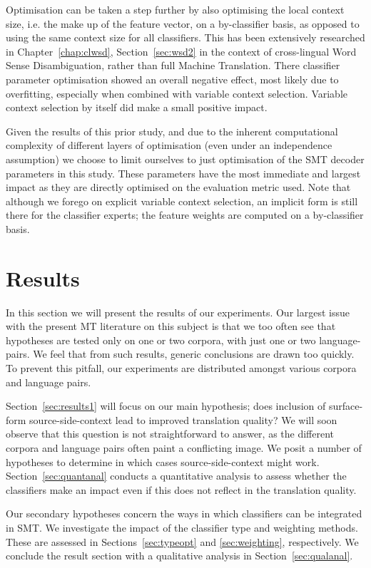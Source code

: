 Optimisation can be taken a step further by also optimising the local context
size, i.e. the make up of the feature vector, on a by-classifier basis, as
opposed to using the same context size for all classifiers. This has been
extensively researched in Chapter~\ref{chap:clwsd}, Section~\ref{sec:wsd2} in
the context of cross-lingual Word Sense Disambiguation, rather than full
Machine Translation. There classifier parameter optimisation showed an
overall negative effect, most likely due to overfitting, especially when
combined with variable context selection. Variable context selection by itself
did make a small positive impact.

Given the results of this prior study, and due to the inherent computational
complexity of different layers of optimisation (even under an independence
assumption) we choose to limit ourselves to just optimisation of the SMT
decoder parameters in this study. These parameters have the most immediate and
largest impact as they are directly optimised on the evaluation metric used.
Note that although we forego on explicit variable context selection, an
implicit form is still there for the classifier experts; the feature weights
are computed on a by-classifier basis.

\section{Results}
\label{sec:results}

In this section we will present the results of our experiments.  Our largest
issue with the present MT literature on this subject is that we too often see
that hypotheses are tested only on one or two corpora, with just one or two
language-pairs. We feel that from such results, generic conclusions are drawn
too quickly. To prevent this pitfall, our experiments are distributed amongst
various corpora and language pairs.

Section~\ref{sec:results1} will focus on our main hypothesis; does inclusion of
surface-form source-side-context lead to improved translation quality? We will
soon observe that this question is not straightforward to answer, as the
different corpora and language pairs often paint a conflicting image. We posit
a number of hypotheses to determine in which cases source-side-context might
work. Section~\ref{sec:quantanal} conducts a quantitative analysis to assess
whether the classifiers make an impact even if this does not reflect in the
translation quality.

Our secondary hypotheses concern the ways in which classifiers can be
integrated in SMT. We investigate the impact of the classifier type and
weighting methods.  These are assessed in Sections~\ref{sec:typeopt} and
\ref{sec:weighting}, respectively. We conclude the result section with a
qualitative analysis in Section~\ref{sec:qualanal}.

